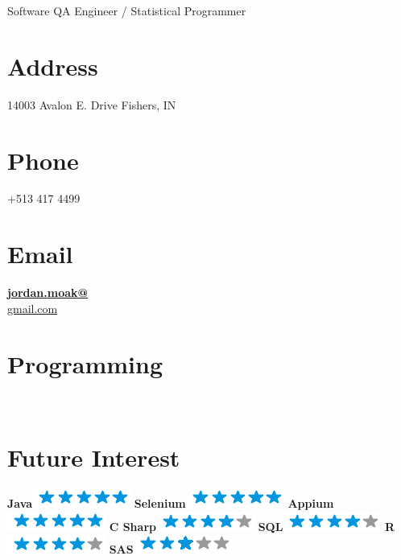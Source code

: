 \documentclass[]{./moak-resume}
\begin{document}
      {Software QA Engineer / Statistical Programmer}


\begin{aside}
  \section{Address}
    14003 Avalon E. Drive
    Fishers, IN
    ~
  \section{Phone}
    +513 417 4499
    ~
  \section{Email}
    \href{mailto:jordan.moak@gmail.com}{\textbf{jordan.moak@}\\gmail.com}
    ~
  \section{Programming}
	\programmingPie{}
    ~
  \section{Future Interest}
    \textbf{Java}\includegraphics[scale=0.40]{img/5stars.png}
    \textbf{Selenium}\includegraphics[scale=0.40]{img/5stars.png}
    \textbf{Appium}\includegraphics[scale=0.40]{img/5stars.png}
    \textbf{C Sharp}\includegraphics[scale=0.40]{img/4stars.png}
    \textbf{SQL}\includegraphics[scale=0.40]{img/4stars.png}
    \textbf{R}\includegraphics[scale=0.40]{img/4stars.png}
    \textbf{SAS}\includegraphics[scale=0.40]{img/3stars.png}
    ~

\end{aside}
\end{document}
